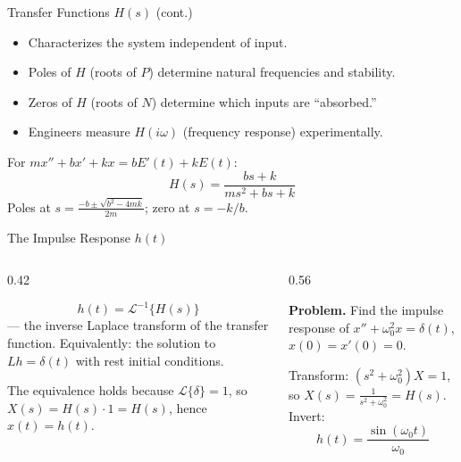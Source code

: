 \documentclass[aspectratio=169,11pt]{beamer}
\begin{document}
\begin{frame}{Transfer Functions $H(s)$ (cont.)}
\footnotesize
\begin{methodbox}
\begin{itemize}
\item Characterizes the system independent of input.
\item Poles of $H$ (roots of $P$) determine natural frequencies and stability.
\item Zeros of $H$ (roots of $N$) determine which inputs are ``absorbed.''
\item Engineers measure $H(i\omega)$ (frequency response) experimentally.
\end{itemize}
\end{methodbox}
\vspace{0.5mm}
\begin{examplebox}
For $mx'' + bx' + kx = bE'(t) + kE(t)$:
\[H(s) = \frac{bs + k}{ms^2 + bs + k}\]
Poles at $s = \frac{-b \pm \sqrt{b^2-4mk}}{2m}$; zero at $s = -k/b$.
\end{examplebox}
\end{frame}

\begin{frame}{The Impulse Response $h(t)$}
\footnotesize
\begin{columns}[T]
\begin{column}{0.42\textwidth}
\begin{formulabox}[Definition]
\[h(t) = \mathcal{L}^{-1}\{H(s)\}\]
--- the inverse Laplace transform of the transfer function. Equivalently: the solution to $Lh = \delta(t)$ with rest initial conditions.

\medskip
The equivalence holds because $\mathcal{L}\{\delta\} = 1$, so $X(s) = H(s)\cdot 1 = H(s)$, hence $x(t) = h(t)$.
\end{formulabox}
\end{column}
\begin{column}{0.56\textwidth}
\begin{examplebox}
\textbf{Problem.} Find the impulse response of $x'' + \omega_0^2 x = \delta(t)$, $x(0) = x'(0) = 0$.

Transform: $(s^2 + \omega_0^2)X = 1$, so $X(s) = \frac{1}{s^2+\omega_0^2} = H(s)$. Invert:
\[h(t) = \frac{\sin(\omega_0 t)}{\omega_0}\]

\end{examplebox}
\end{column}
\end{columns}
\end{frame}
\end{document}
